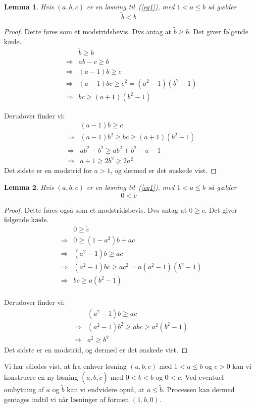 \documentclass[12pt,oneside,a4paper]{article}
\newcommand{\bas}{\begin{eqnarray*}}
\newcommand{\eas}{\end{eqnarray*}}
\newtheorem{lem}{Lemma}[section]
\begin{document}
\begin{lem}
    Hvis $(a,b,c)$ er en løsning til~(\ref{eq1}), med $1<a\le b$
    så gælder
    $$
    \tilde b < b
    $$
\end{lem}
\begin{proof}
    Dette føres som et modstridsbevis. Dvs antag at $\tilde b \ge b$. Det giver
    følgende kæde.
    \bas
    && \tilde b \ge b \\
    &\Rightarrow& ab-c \ge b \\
    &\Rightarrow& (a-1)b \ge c \\
    &\Rightarrow& (a-1)bc \ge c^2 = (a^2-1)(b^2-1) \\
    &\Rightarrow& bc \ge (a+1)(b^2-1)
    \eas
    
    Derudover finder vi:
    \bas
    && (a-1)b \ge c \\
    &\Rightarrow& (a-1)b^2 \ge bc \ge (a+1)(b^2-1) \\
    &\Rightarrow& ab^2-b^2 \ge ab^2+b^2-a-1 \\
    &\Rightarrow& a+1 \ge 2b^2 \ge 2a^2
    \eas
    Det sidste er en modstrid for $a>1$, og dermed er det ønskede vist.
\end{proof}

\begin{lem}
    Hvis $(a,b,c)$ er en løsning til~(\ref{eq1}), med $1<a\le b$
    så gælder
    $$
    0 < \tilde c
    $$
\end{lem}
\begin{proof}
    Dette føres også som et modstridsbevis. Dvs antag at $0 \ge \tilde c$. Det
    giver følgende kæde.
    \bas
    &&0 \ge \tilde c\\
    &\Rightarrow& 0 \ge (1-a^2)b+ac \\
    &\Rightarrow& (a^2-1)b \ge ac \\
    &\Rightarrow& (a^2-1)bc \ge ac^2 = a(a^2-1)(b^2-1) \\
    &\Rightarrow& bc \ge a(b^2-1) \\
    \eas
    
    Derudover finder vi:
    \bas
    && (a^2-1)b \ge ac \\
    &\Rightarrow& (a^2-1)b^2 \ge abc \ge a^2(b^2-1) \\
    &\Rightarrow& a^2 \ge b^2
    \eas
    Det sidste er en modstrid, og dermed er det ønskede vist.
\end{proof}

Vi har således vist, at fra enhver løsning $(a,b,c)$ med $1<a\le b$ og $c>0$
kan vi konstruere en ny løsning $(a, \tilde b, \tilde c)$ med $0<\tilde b < b$
og $0 < \tilde c$. Ved eventuel ombytning af $a$ og $\tilde b$ kan vi endvidere
opnå, at $a\le\tilde b$. Processen kan dermed gentages indtil vi når løsninger
af formen $(1, b, 0)$.
\end{document}
